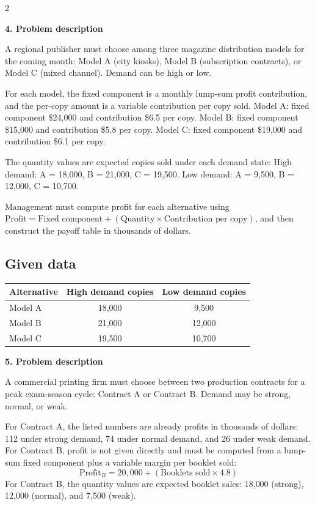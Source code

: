 \documentclass[12pt]{article}
\newcommand{\SubsectionBox}[1]{%
	\noindent\colorbox{gray!30}{%
		\parbox{\linewidth}{\textbf{#1}}%
	}\par\vspace{0.35cm}%
}
\begin{document}
\begin{multicols}{2}
		\vspace{0.25cm}
		\SubsectionBox{4. Problem description}\vspace{-0.25cm}
		A regional publisher must choose among three magazine distribution models for the coming month: Model A (city kiosks),
				Model B (subscription contracts), or Model C (mixed channel). Demand can be high or low.
				
				For each model, the fixed component is a monthly lump-sum profit contribution, and the per-copy amount is a variable contribution per copy sold.
				Model A: fixed component \$24{,}000 and contribution \$6.5 per copy.
				Model B: fixed component \$15{,}000 and contribution \$5.8 per copy.
				Model C: fixed component \$19{,}000 and contribution \$6.1 per copy.
				
				The quantity values are expected copies sold under each demand state:
				High demand: A = 18{,}000, B = 21{,}000, C = 19{,}500.
				Low demand: A = 9{,}500, B = 12{,}000, C = 10{,}700.
				
				Management must compute profit for each alternative using
				\(\text{Profit}=\text{Fixed component}+(\text{Quantity}\times\text{Contribution per copy})\), and then construct the payoff table in thousands of dollars.
				\subsection*{Given data}
				\begin{center}
					\begin{tabular}{l c c}
						\toprule
						Alternative & High demand copies & Low demand copies \\
						\midrule
						Model A & 18{,}000 & 9{,}500 \\
						Model B & 21{,}000 & 12{,}000 \\
						Model C & 19{,}500 & 10{,}700 \\
						\bottomrule
					\end{tabular}
				\end{center}

		\vspace{0.25cm}
		\SubsectionBox{5. Problem description}\vspace{-0.25cm}
		A commercial printing firm must choose between two production contracts for a peak exam-season cycle: Contract A or Contract B.
				Demand may be strong, normal, or weak.
				
				For Contract A, the listed numbers are already profits in thousands of dollars: 112 under strong demand, 74 under normal demand, and 26 under weak demand.
				For Contract B, profit is not given directly and must be computed from a lump-sum fixed component plus a variable margin per booklet sold:
				\[
				\text{Profit}_B = 20{,}000 + (\text{Booklets sold} \times 4.8)
				\]
				For Contract B, the quantity values are expected booklet sales: 18{,}000 (strong), 12{,}000 (normal), and 7{,}500 (weak).
				

\end{multicols}
\end{document}
